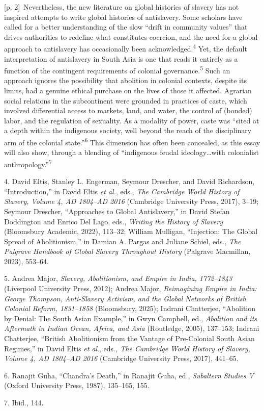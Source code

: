 \documentclass[10pt,a4paper]{article}
\begin{document}
{\scriptsize\color{gray} [p. 2]}\ Nevertheless, the new literature on global histories of slavery has not inspired attempts to write global histories of antislavery. Some scholars have called for a better understanding of the slow “drift in community values” that drives authorities to redefine what constitutes coercion, and the need for a global approach to antislavery has occasionally been acknowledged.\nobreak\textsuperscript{4} Yet, the default interpretation of antislavery in South Asia is one that reads it entirely as a function of the contingent requirements of colonial governance.\nobreak\textsuperscript{5} Such an approach ignores the possibility that abolition in colonial contexts, despite its limits, had a genuine ethical purchase on the lives of those it affected. Agrarian social relations in the subcontinent were grounded in practices of caste, which involved differential access to markets, land, and water, the control of (bonded) labor, and the regulation of sexuality. As a modality of power, caste was “sited at a depth within the indigenous society, well beyond the reach of the disciplinary arm of the colonial state.”\nobreak\textsuperscript{6} This dimension has often been concealed, as this essay will also show, through a blending of “indigenous feudal ideology…with colonialist anthropology.”\nobreak\textsuperscript{7}\par{\small 4. David Eltis, Stanley L. Engerman, Seymour Drescher, and David Richardson, “Introduction,” in David Eltis \textit{et al.}, eds., \textit{The Cambridge World History of Slavery, Volume 4, AD 1804–AD 2016} (Cambridge University Press, 2017), 3–19; Seymour Drescher, “Approaches to Global Antislavery,” in David Stefan Doddington and Enrico Del Lago, eds., \textit{Writing the History of Slavery} (Bloomsbury Academic, 2022), 113–32; William Mulligan, “Injection: The Global Spread of Abolitionism,” in Damian A. Pargas and Juliane Schiel, eds., \textit{The Palgrave Handbook of Global Slavery Throughout History} (Palgrave Macmillan, 2023), 553–64.\par}{\small 5. Andrea Major, \textit{Slavery, Abolitionism, and Empire in India, 1772–1843} (Liverpool University Press, 2012); Andrea Major, \textit{Reimagining Empire in India: George Thompson, Anti-Slavery Activism, and the Global Networks of British Colonial Reform, 1831–1858} (Bloomsbury, 2025); Indrani Chatterjee, “Abolition by Denial: The South Asian Example,” in Gwyn Campbell, ed., \textit{Abolition and its Aftermath in Indian Ocean, Africa, and Asia} (Routledge, 2005), 137–153; Indrani Chatterjee, “British Abolitionism from the Vantage of Pre-Colonial South Asian Regimes,” in David Eltis \textit{et al}., eds.\textit{, The Cambridge World History of Slavery, Volume 4, AD 1804–AD 2016} (Cambridge University Press, 2017), 441–65.\par}{\small 6. Ranajit Guha, “Chandra’s Death,” in Ranajit Guha, ed., \textit{Subaltern Studies V} (Oxford University Press, 1987), 135–165, 155.\par}{\small 7. Ibid., 144.\par}
\end{document}
